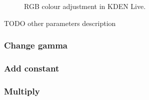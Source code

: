 \documentclass[../MasterThesis.tex]{subfiles}
\begin{document}
\begin{figure}[H]
	\begin{center}
		\caption[RGB colour adjustment in KDEN Live.]{RGB colour adjustment in KDEN Live.}
		\label{figure:kdenlive_rgb}
	\end{center}
\end{figure}


TODO other parameters description

\subsubsection*{Change gamma}

\subsubsection*{Add constant}

\subsubsection*{Multiply}




	
	
	
	
\end{document}
